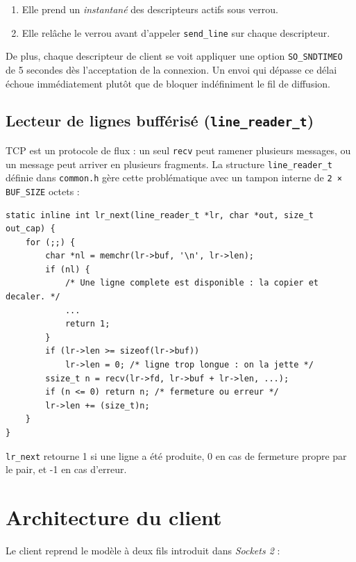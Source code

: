 \documentclass[12pt,a4paper]{article}
\begin{document}
\begin{enumerate}
    \item Elle prend un \emph{instantané} des descripteurs actifs sous verrou.
    \item Elle relâche le verrou avant d'appeler \texttt{send\_line} sur chaque
          descripteur.
\end{enumerate}

De plus, chaque descripteur de client se voit appliquer une option
\texttt{SO\_SNDTIMEO} de 5 secondes dès l'acceptation de la connexion.
Un envoi qui dépasse ce délai échoue immédiatement plutôt que de bloquer
indéfiniment le fil de diffusion.

\subsection{Lecteur de lignes bufférisé (\texttt{line\_reader\_t})}

TCP est un protocole de flux : un seul \texttt{recv} peut ramener plusieurs
messages, ou un message peut arriver en plusieurs fragments. La structure
\texttt{line\_reader\_t} définie dans \texttt{common.h} gère cette
problématique avec un tampon interne de \texttt{2\,×\,BUF\_SIZE} octets :

\begin{lstlisting}[caption={\texttt{lr\_next}, lecture d'une ligne complète}]
static inline int lr_next(line_reader_t *lr, char *out, size_t out_cap) {
    for (;;) {
        char *nl = memchr(lr->buf, '\n', lr->len);
        if (nl) {
            /* Une ligne complete est disponible : la copier et decaler. */
            ...
            return 1;
        }
        if (lr->len >= sizeof(lr->buf))
            lr->len = 0; /* ligne trop longue : on la jette */
        ssize_t n = recv(lr->fd, lr->buf + lr->len, ...);
        if (n <= 0) return n; /* fermeture ou erreur */
        lr->len += (size_t)n;
    }
}
\end{lstlisting}

\texttt{lr\_next} retourne 1 si une ligne a été produite, 0 en cas de
fermeture propre par le pair, et -1 en cas d'erreur.

\section{Architecture du client}

Le client reprend le modèle à deux fils introduit dans \emph{Sockets 2} :
\end{document}
